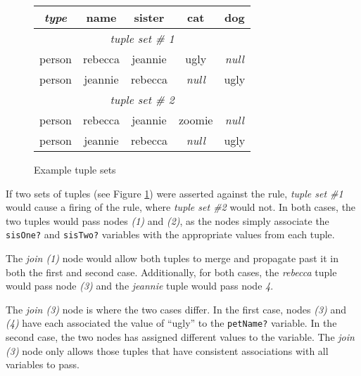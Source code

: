 \setlength{\extrarowheight}{3pt}


\begin{figure}[htbpc]
  \begin{center}
    \begin{tabular}{|c||c|c|c|c|}
      \hline
        \textsf{\emph{type}} & \textsf{name} & \textsf{sister} & \textsf{cat} & \textsf{dog} \\
      \hline
      \hline
        \multicolumn{5}{|c|}{\emph{tuple set \# 1}}\\
      \hline 
      \hline 
        person & rebecca & jeannie & ugly & \emph{null} \\
      \hline
        person & jeannie & rebecca & \emph{null} & ugly \\
      \hline
      \hline
        \multicolumn{5}{|c|}{\emph{tuple set \# 2}}\\
      \hline
      \hline
        person & rebecca & jeannie & zoomie & \emph{null} \\
      \hline
        person & jeannie & rebecca & \emph{null} & ugly \\
      \hline
    \end{tabular}
  \end{center}

  \caption{Example tuple sets}
  \label{table.tuplesets}
\end{figure}

If two sets of tuples (see Figure \ref{table.tuplesets}) were
asserted against the rule, \emph{tuple set \#1} would cause a firing
of the rule, where \emph{tuple set \#2} would not.  In both cases,
the two tuples would pass nodes \emph{(1)} and \emph{(2)}, as the
nodes simply associate the \verb|sisOne?| and \verb|sisTwo?| variables
with the appropriate values from each tuple.

The \emph{join (1)} node would allow both tuples to merge and
propagate past it in both the first and second case.  Additionally,
for both cases, the \emph{rebecca} tuple would pass node \emph{(3)}
and the \emph{jeannie} tuple would pass node \emph{4}.

The \emph{join (3)} node is where the two cases differ.  In the first
case, nodes \emph{(3)} and \emph{(4)} have each associated the value
of ``ugly'' to the \verb|petName?| variable.  In the second case, the
two nodes has assigned different values to the variable.  The
\emph{join (3)} node only allows those tuples that have consistent
associations with all variables to pass.
